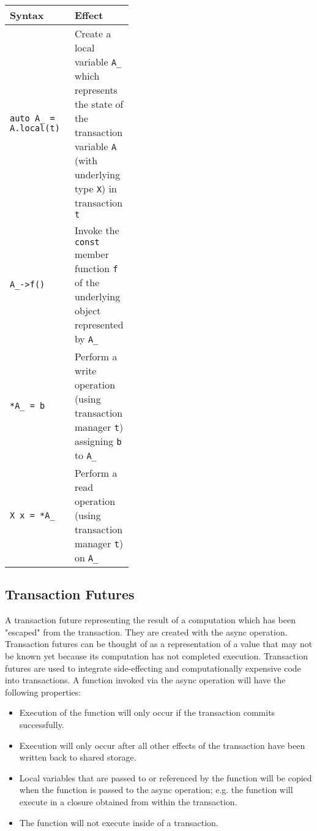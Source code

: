 \documentclass[conference]{IEEEtran}
\begin{document}
\begin{table}[htbp]
\center
\begin{tabular}{|l|m{0.4\linewidth}|}
\hline
\textbf{Syntax}			& \textbf{Effect} \\
\hline
\lstinline$auto A_ = A.local(t)$		& Create a local variable \lstinline$A_$ which represents the state of the transaction variable \lstinline$A$ (with underlying type \lstinline$X$) in transaction \lstinline$t$ \\
\hline
\lstinline$A_->f()$		& Invoke the \lstinline$const$ member function \lstinline$f$ of the underlying object represented by \lstinline$A_$ \\
\hline
\lstinline$*A_ = b$		& Perform a write operation (using transaction manager \lstinline$t$) assigning \lstinline$b$ to \lstinline$A_$ \\
\hline
\lstinline$X x = *A_$	& Perform a read operation (using transaction manager \lstinline$t$) on \lstinline$A_$ \\
\hline
\end{tabular}
\end{table}

\subsection{Transaction Futures}

A transaction future representing the result of a computation which has been "escaped" from the transaction. They are created with the async operation. Transaction futures can be thought of as a representation of a value that may not be known yet because its computation has not completed execution.
Transaction futures are used to integrate side-effecting and computationally expensive code into transactions. A function invoked via the async operation will have the following properties:

\begin{itemize}
\item Execution of the function will only occur if the transaction commits successfully.
\item Execution will only occur after all other effects of the transaction have been written back to shared storage.
\item Local variables that are passed to or referenced by the function will be copied when the function is passed to the async operation; e.g. the function will execute in a closure obtained from within the transaction.
\item The function will not execute inside of a transaction.
\end{itemize}
\end{document}
